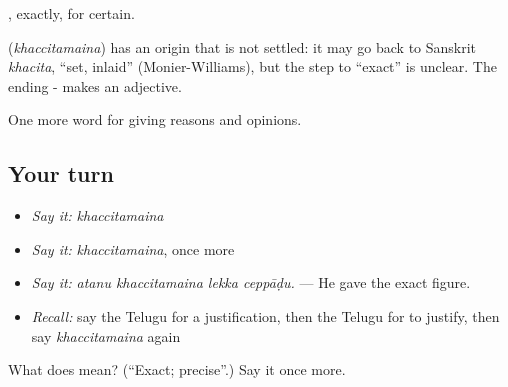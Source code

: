 , exactly, for certain.

\begin{cousinweb}
\textbf{} (\emph{khaccitamaina}) has an origin that is not settled: it may go back to Sanskrit \emph{khacita}, \textquotedblleft{}set, inlaid\textquotedblright{} (Monier-Williams), but the step to \textquotedblleft{}exact\textquotedblright{} is unclear. The ending - makes an adjective.
\end{cousinweb}

\begin{grammarlens}[title={What you've built}]
One more word for giving reasons and opinions.
\end{grammarlens}

\subsection*{Your turn}
\begin{itemize}
\raggedright
  \item \emph{Say it:} \emph{khaccitamaina}
  \item \emph{Say it:} \emph{khaccitamaina}, once more
  \item \emph{Say it:} \emph{atanu khaccitamaina lekka ceppāḍu.} — He gave the exact figure.
  \item \emph{Recall:} say the Telugu for a justification, then the Telugu for to justify, then say \emph{khaccitamaina} again
\end{itemize}

\begin{tcolorbox}[breakable,colback=teal!4,colframe=teal!35!black,title={Before you move on}]
What does  mean? (\textquotedblleft{}Exact; precise\textquotedblright{}.) Say it once more.
\end{tcolorbox}
